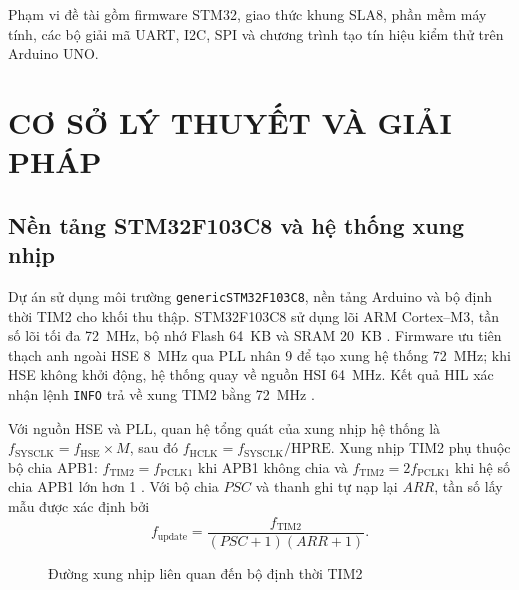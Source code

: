 Phạm vi đề tài gồm firmware STM32, giao thức khung SLA8, phần mềm máy tính, các bộ giải mã UART, I2C, SPI và chương trình tạo tín hiệu kiểm thử trên Arduino UNO.

\chapter{CƠ SỞ LÝ THUYẾT VÀ GIẢI PHÁP}\label{chap:theory}

\section{Nền tảng STM32F103C8 và hệ thống xung nhịp}\label{sec:stm32-clock}

Dự án sử dụng môi trường \texttt{genericSTM32F103C8}, nền tảng Arduino và bộ định thời TIM2 cho khối thu thập. STM32F103C8 sử dụng lõi ARM Cortex--M3, tần số lõi tối đa 72~MHz, bộ nhớ Flash 64~KB và SRAM 20~KB \cite{st-ds5319}. Firmware ưu tiên thạch anh ngoài HSE 8~MHz qua PLL nhân 9 để tạo xung hệ thống 72~MHz; khi HSE không khởi động, hệ thống quay về nguồn HSI 64~MHz. Kết quả HIL xác nhận lệnh \texttt{INFO} trả về xung TIM2 bằng 72~MHz \cite{hil2026}.

Với nguồn HSE và PLL, quan hệ tổng quát của xung nhịp hệ thống là \(f_{\mathrm{SYSCLK}}=f_{\mathrm{HSE}}\times M\), sau đó \(f_{\mathrm{HCLK}}=f_{\mathrm{SYSCLK}}/\mathrm{HPRE}\). Xung nhịp TIM2 phụ thuộc bộ chia APB1: \(f_{\mathrm{TIM2}}=f_{\mathrm{PCLK1}}\) khi APB1 không chia và \(f_{\mathrm{TIM2}}=2f_{\mathrm{PCLK1}}\) khi hệ số chia APB1 lớn hơn 1 \cite{st-rm0008}. Với bộ chia \(PSC\) và thanh ghi tự nạp lại \(ARR\), tần số lấy mẫu được xác định bởi
\[
 f_{\mathrm{update}}=\frac{f_{\mathrm{TIM2}}}{(PSC+1)(ARR+1)}.
\]

\begin{figure}[H]
\centering
{}
\caption{Đường xung nhịp liên quan đến bộ định thời TIM2}
\label{fig:clock-tree}
\end{figure}

